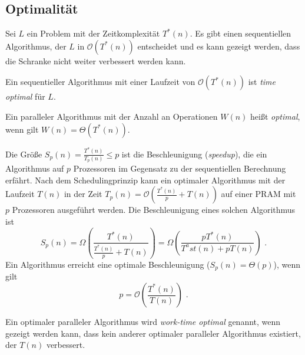 \subsection{Optimalität}
Sei $L$ ein Problem mit der Zeitkomplexität $T^\ast(n)$.
Es gibt einen sequentiellen Algorithmus, der $L$ in $\mathcal{O}(T^\ast(n))$
entscheidet und es kann gezeigt werden, dass die Schranke nicht weiter
verbessert werden kann.
%
\begin{define}
    Ein sequentieller Algorithmus mit einer Laufzeit von
    $\mathcal{O}(T^\ast(n))$ ist \emph{time optimal} für $L$.
\end{define}
%
\begin{define}
    Ein paralleler Algorithmus mit der Anzahl an Operationen $W(n)$ heißt
    \emph{optimal}, wenn gilt $W(n) = \Theta(T^\ast(n))$.
\end{define}
%
Die Größe $S_p(n) = \frac{T^\ast(n)}{T_p(n)} \leq p$ ist die Beschleunigung
(\emph{speedup}), die ein Algorithmus auf $p$ Prozessoren im Gegensatz zu der
sequentiellen Berechnung erfährt.
Nach dem Schedulingprinzip kann ein optimaler Algorithmus mit der 
Laufzeit $T(n)$ in der Zeit
$T_p(n) = \mathcal{O} \left( \frac{T^\ast(n)}{p} + T(n) \right)$
auf einer PRAM mit $p$ Prozessoren ausgeführt werden.
Die Beschleunigung eines solchen Algorithmus ist
\begin{equation}
    S_p(n) = \Omega \left( \frac{T^\ast(n)}{\frac{T^\ast(n)}{p} + T(n)} \right)
    = \Omega \left( \frac{pT^\ast(n)}{T^ast(n) + pT(n)} \right) \text{ .}
\end{equation}
Ein Algorithmus erreicht eine optimale Beschleunigung ($S_p(n) = \Theta(p)$),
wenn gilt
\begin{equation}
    p = \mathcal{O} \left( \frac{T^\ast(n)}{T(n)} \right) \text{ .}
\end{equation}
%
\begin{define}
    Ein optimaler paralleler Algorithmus wird \emph{work-time optimal} genannt,
    wenn gezeigt werden kann, dass kein anderer optimaler paralleler
    Algorithmus existiert, der $T(n)$ verbessert.
\end{define}
\cite[S.3,32]{jaja}
